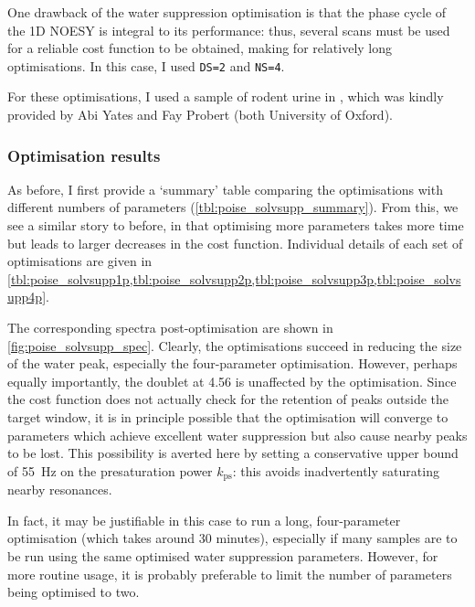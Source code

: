 One drawback of the water suppression optimisation is that the phase cycle of the 1D NOESY is integral to its performance: thus, several scans must be used for a reliable cost function to be obtained, making for relatively long optimisations.
In this case, I used \texttt{DS=2} and \texttt{NS=4}.

For these optimisations, I used a sample of rodent urine in , which was kindly provided by Abi Yates and Fay Probert (both University of Oxford).



\subsubsection{Optimisation results}

As before, I first provide a `summary' table comparing the optimisations with different numbers of parameters (\cref{tbl:poise_solvsupp_summary}).
From this, we see a similar story to before, in that optimising more parameters takes more time but leads to larger decreases in the cost function.
Individual details of each set of optimisations are given in \cref{tbl:poise_solvsupp1p,tbl:poise_solvsupp2p,tbl:poise_solvsupp3p,tbl:poise_solvsupp4p}.

The corresponding spectra post-optimisation are shown in \cref{fig:poise_solvsupp_spec}.
Clearly, the optimisations succeed in reducing the size of the water peak, especially the four-parameter optimisation.
However, perhaps equally importantly, the doublet at \qty{4.56}{\ppm} is unaffected by the optimisation.
Since the cost function does not actually check for the retention of peaks outside the target window, it is in principle possible that the optimisation will converge to parameters which achieve excellent water suppression but also cause nearby peaks to be lost.
This possibility is averted here by setting a conservative upper bound of \qty{55}{\Hz} on the presaturation power $k_\text{ps}$: this avoids inadvertently saturating nearby resonances.

In fact, it may be justifiable in this case to run a long, four-parameter optimisation (which takes around 30 minutes), especially if many samples are to be run using the same optimised water suppression parameters.
However, for more routine usage, it is probably preferable to limit the number of parameters being optimised to two.



